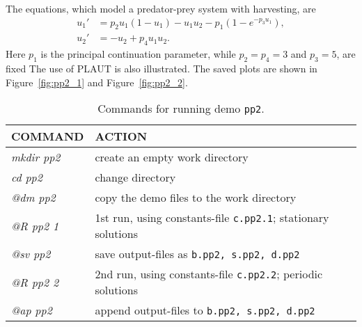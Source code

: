 \documentclass[12pt]{report}
\begin{document}
The equations, which model a predator-prey system with harvesting, are
\begin{equation} \begin{array}{cl}
  u_1 ' &= p_2 u_1 (1 - u_1 ) - u_1 u_2 - p_1 (1-e^{-p_3 u_1}) ,\\
  u_2 ' &= -u_2  + p_4 u_1 u_2  .\end{array} \end{equation}
Here $p_1$ is the principal continuation parameter,
while $p_2=p_4=3$ and $p_3=5$, are fixed
The use of {\cal PLAUT} is also illustrated. The saved plots are shown
in Figure~\ref{fig:pp2_1} and  Figure~\ref{fig:pp2_2}.
\begin{table}[htbp]
\begin{center}
\begin{tabular}{| l | l |}
\hline
  COMMAND  & ACTION \\
\hline
  {\it mkdir pp2} & create an empty work directory \\ 
  {\it cd pp2} & change directory \\ 
  {\it @dm pp2} & copy the demo files to the work directory \\ 
\hline
  {\it @R pp2 1} & 1st run, using constants-file {\tt c.pp2.1}; stationary solutions \\ 
  {\it @sv pp2} & save output-files as {\tt b.pp2, s.pp2, d.pp2} \\ 
\hline
  {\it @R pp2 2} & 2nd run, using constants-file {\tt c.pp2.2}; periodic solutions \\ 
  {\it @ap pp2} & append output-files to {\tt b.pp2, s.pp2, d.pp2} \\ 
\hline
\end{tabular}
\caption{Commands for running demo {\tt pp2}.}
\label{tbl:demo_pp2_1}
\end{center}
\end{table}
\end{document}
